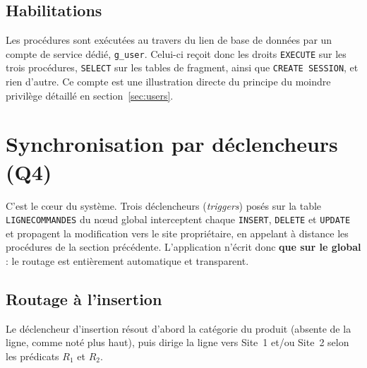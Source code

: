 \documentclass[11pt,a4paper]{article}
\begin{document}
\subsection{Habilitations}

Les procédures sont exécutées au travers du lien de base de données par un
compte de service dédié, \texttt{g\_user}. Celui-ci reçoit donc les droits
\texttt{EXECUTE} sur les trois procédures, \texttt{SELECT} sur les tables de
fragment, ainsi que \texttt{CREATE SESSION}, et rien d'autre. Ce compte est une
illustration directe du principe du moindre privilège détaillé en
section~\ref{sec:users}.

\section{Synchronisation par déclencheurs (Q4)}
\label{sec:triggers}

C'est le cœur du système. Trois déclencheurs (\emph{triggers}) posés sur la
table \texttt{LIGNECOMMANDES} du nœud global interceptent chaque \texttt{INSERT},
\texttt{DELETE} et \texttt{UPDATE} et propagent la modification vers le site
propriétaire, en appelant à distance les procédures de la
section précédente. L'application n'écrit donc \textbf{que sur le global} : le
routage est entièrement automatique et transparent.

\subsection{Routage à l'insertion}

Le déclencheur d'insertion résout d'abord la catégorie du produit (absente de
la ligne, comme noté plus haut), puis dirige la ligne vers Site~1 et/ou Site~2
selon les prédicats $R_1$ et $R_2$.
\end{document}
